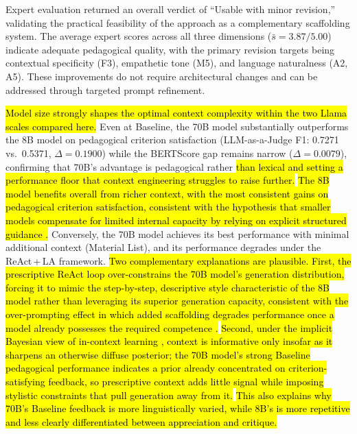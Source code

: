 \documentclass[conference,a4paper]{IEEEtran}
\begin{document}
Expert evaluation returned an overall
verdict of ``Usable with minor revision,''
validating the practical feasibility of the
approach as a complementary scaffolding system. 
The average expert scores across all three 
dimensions ($\bar{s} = 3.87/5.00$) indicate 
adequate pedagogical quality, with the primary 
revision targets being contextual specificity 
(F3), empathetic tone (M5), and language 
naturalness (A2, A5). These improvements do 
not require architectural changes and can be 
addressed through targeted prompt refinement.

\hl{Model size strongly shapes
the optimal context complexity within the two Llama scales
compared here.} Even at Baseline, the 70B model
substantially outperforms the 8B model on
pedagogical criterion satisfaction
(LLM-as-a-Judge F1: 0.7271 vs.\ 0.5371,
$\Delta = 0.1900$) while the BERTScore gap
remains narrow ($\Delta = 0.0079$), confirming
that 70B's advantage is pedagogical rather
\hl{than lexical and setting a performance floor
that context engineering struggles to raise further.} \hl{The 8B model
benefits overall from richer context, with the
most consistent gains on pedagogical criterion
satisfaction, consistent with the hypothesis that
smaller models compensate for limited internal
capacity by relying on explicit structured
guidance \mbox{\cite{tang2025fewshot, pawlik2025choice}}.}
Conversely, the 70B model achieves its best
performance with minimal additional context
(Material List), and its performance degrades
under the ReAct\,+\,LA framework. \hl{Two
complementary explanations are plausible. First,
the prescriptive ReAct loop over-constrains the
70B model's generation distribution, forcing it
to mimic the step-by-step, descriptive style
characteristic of the 8B model rather than
leveraging its superior generation capacity,
consistent with the over-prompting effect in
which added scaffolding degrades performance once
a model already possesses the required competence
\mbox{\cite{tang2025fewshot}}.} \hl{Second, under the implicit
Bayesian view of in-context learning
\mbox{\cite{xie2022explanation}}, context is informative
only insofar as it sharpens an otherwise diffuse
posterior; the 70B model's strong Baseline
pedagogical performance indicates a prior already
concentrated on criterion-satisfying feedback, so
prescriptive context adds little signal while
imposing stylistic constraints that pull generation
away from it.} \hl{This also explains why 70B's Baseline
feedback is more linguistically varied, while
8B's is more repetitive and less clearly
differentiated between appreciation and critique.}
\end{document}
